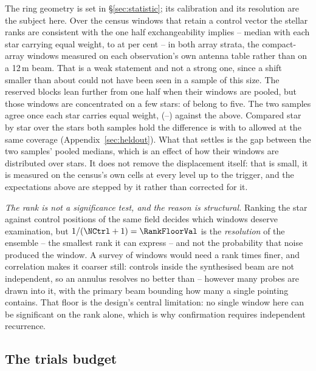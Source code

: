 The ring geometry is set in \S\ref{sec:statistic}; its calibration and its
resolution are the subject here. Over the \VerNTested{} census windows that
retain a control vector the stellar ranks are consistent with the one half
exchangeability implies -- median \BkRankBalSurv{} with each star carrying
equal weight, \BkRankBalSurvLo{} to \BkRankBalSurvHi{} at \CeCovPct{} per
cent -- in both array
strata, the compact-array windows measured on each observation's own antenna
table rather than on a 12\,m beam. That is a weak statement and not a strong
one, since a shift smaller than about \VerKsPowerAca{} could not have been
seen in a sample of this size. The reserved blocks lean further from one half
when their windows are pooled, but those windows are concentrated on a few
stars: \BkRankTopFiveWin{} of \HoWin{} belong to five. The two
samples agree once each star carries equal weight, \BkRankBalHo{}
(\BkRankBalHoLo--\BkRankBalHoHi) against the \BkRankBalSurv{} above.
Compared star by star over the \BkRankPairedStars{} stars both samples hold
the difference is \BkRankPaired{} with \BkRankPairedLo{} to
\BkRankPairedHi{} allowed at the same coverage
(Appendix~\ref{sec:heldout}). What that settles is
the gap between the two samples' pooled medians, which is an effect of how
their windows are distributed over stars. It does not remove the displacement
itself: that is small, it is measured on the census's own cells at every level
up to the trigger, and the expectations above are stepped by it rather than
corrected for it.

\emph{The rank is not a significance test, and the reason is structural.}
Ranking the star against \NCtrl{} control positions of the same field
decides which windows deserve examination, but $1/(\NCtrl+1)=\RankFloorVal$
is the \emph{resolution} of the ensemble -- the smallest rank it can
express -- and not the probability that noise produced the window. A survey
of \NWindows{} windows would need a rank \BonfRankRatio{} times finer, and
correlation makes it coarser still: controls inside the synthesised beam are
not independent, so an annulus resolves no better than
\RankEffLo--\RankEffHi{} however many probes are drawn into it, with the
primary beam bounding how many a single pointing contains. That floor is the
design's central limitation: no single window here can be significant on the
rank alone, which is why confirmation requires independent recurrence.

\subsection{The trials budget}

